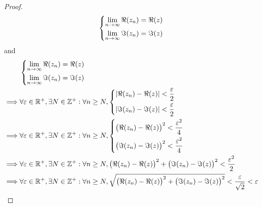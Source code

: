 \begin{proof}
\begin{align*}
\begin{dcases}
                 \lim_{n \to \infty} \Re(z_n) = \Re(z) \\
                 \lim_{n \to \infty} \Im(z_n) = \Im(z)
               \end{dcases}
  \end{align*}
  and
  \begin{align*}
             & \begin{dcases}
                 \lim_{n \to \infty} \Re(z_n) = \Re(z) \\
                 \lim_{n \to \infty} \Im(z_n) = \Im(z)
               \end{dcases}                                                                                                                                                   \\
    \implies & \forall \varepsilon \in \R^+, \exists N \in \Z^+ : \forall n \geq N, \begin{dcases}
                                                                                      \abs{\Re(z_n) - \Re(z)} < \dfrac{\varepsilon}{2} \\
                                                                                      \abs{\Im(z_n) - \Im(z)} < \dfrac{\varepsilon}{2}
                                                                                    \end{dcases}                                                                   \\
    \implies & \forall \varepsilon \in \R^+, \exists N \in \Z^+ : \forall n \geq N, \begin{dcases}
                                                                                      \big(\Re(z_n) - \Re(z)\big)^2 < \dfrac{\varepsilon^2}{4} \\
                                                                                      \big(\Im(z_n) - \Im(z)\big)^2 < \dfrac{\varepsilon^2}{4}
                                                                                    \end{dcases}                           \\
    \implies & \forall \varepsilon \in \R^+, \exists N \in \Z^+ : \forall n \geq N, \big(\Re(z_n) - \Re(z)\big)^2 + \big(\Im(z_n) - \Im(z)\big)^2 < \dfrac{\varepsilon^2}{2}                           \\
    \implies & \forall \varepsilon \in \R^+, \exists N \in \Z^+ : \forall n \geq N, \sqrt{\big(\Re(z_n) - \Re(z)\big)^2 + \big(\Im(z_n) - \Im(z)\big)^2} < \dfrac{\varepsilon}{\sqrt{2}} < \varepsilon \\

\end{align*}
\end{proof}
